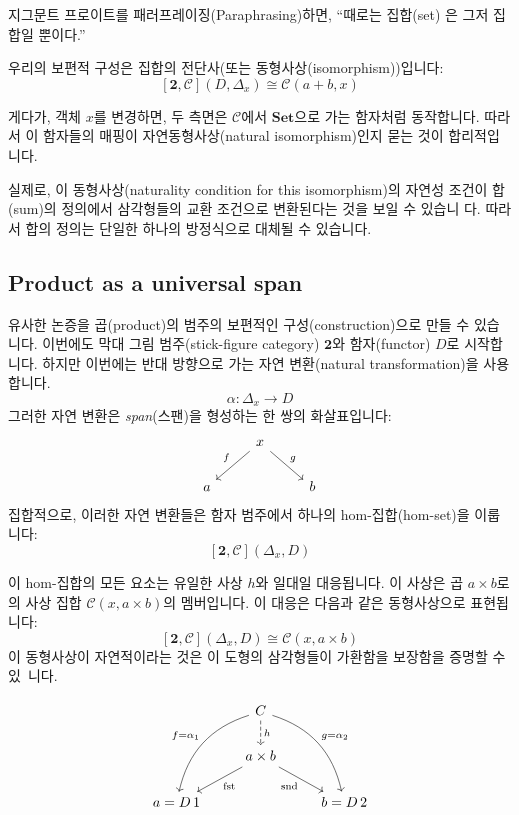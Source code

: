 \documentclass[DaoFP]{subfiles}
\begin{document}
지그문트 프로이트를 패러프레이징(Paraphrasing)하면, ``때로는 집합(set) 은 그저 집합일 뿐이다.''

우리의 보편적 구성은 집합의 전단사(또는 동형사상(isomorphism))입니다:
\[ [\mathbf{2}, \mathcal{C}](D, \Delta_x)  \cong \mathcal{C}(a + b, x) \]

게다가, 객체 $x$를 변경하면, 두 측면은 $\mathcal{C}$에서 $\mathbf{Set}$으로 가는 함자처럼 동작합니다. 따라서 이 함자들의 매핑이 자연동형사상(natural isomorphism)인지 묻는 것이 합리적입니다.

실제로, 이 동형사상(naturality condition for this isomorphism)의 자연성 조건이 합(sum)의 정의에서 삼각형들의 교환 조건으로 변환된다는 것을 보일 수 있습니 다. 따라서 합의 정의는 단일한 하나의 방정식으로 대체될 수 있습니다.

\subsection{Product as a universal span}

유사한 논증을 곱(product)의 범주의 보편적인 구성(construction)으로 만들 수 있습니다. 이번에도 막대 그림 범주(stick-figure category) $\mathbf{2}$와 함자(functor) $D$로 시작합니다. 하지만 이번에는 반대 방향으로 가는 자연 변환(natural transformation)을 사용합니다.
\[ \alpha \colon \Delta_x \to D \]
그러한 자연 변환은 \emph{span}(스팬)을 형성하는 한 쌍의 화살표입니다:
\[
 \begin{tikzcd}
 &x
 \arrow[dl, "f"']
 \arrow[dr, "g"]
 \\
 a
 && b
  \end{tikzcd}
\]
집합적으로, 이러한 자연 변환들은 함자 범주에서 하나의 hom-집합(hom-set)을 이룹니다:
\[[\mathbf{2}, \mathcal{C}](\Delta_x, D) \]

이 hom-집합의 모든 요소는 유일한 사상 $h$와 일대일 대응됩니다. 이 사상은 곱 $a \times b$로의 사상 집합 $\mathcal{C}(x, a \times b)$의 멤버입니다. 이 대응은 다음과 같은 동형사상으로 표현됩니다:
\[ [\mathbf{2}, \mathcal{C}](\Delta_x, D)  \cong \mathcal{C}(x, a \times b) \]
이 동형사상이 자연적이라는 것은 이 도형의 삼각형들이 가환함을 보장함을 증명할 수 있~니다.

\[
 \begin{tikzcd}
 & C 
\arrow[d, dashed, "h"]
 \arrow[ddl, bend right, "f = \alpha_1"']
 \arrow[ddr, bend left, "g = \alpha_2"]
\\
&a \times b
 \arrow[dl,  "\text{fst}"]
  \arrow[dr,   "\text{snd}"']
\\
a = D\, 1 && b = D \, 2
 \end{tikzcd}
\]
\end{document}
